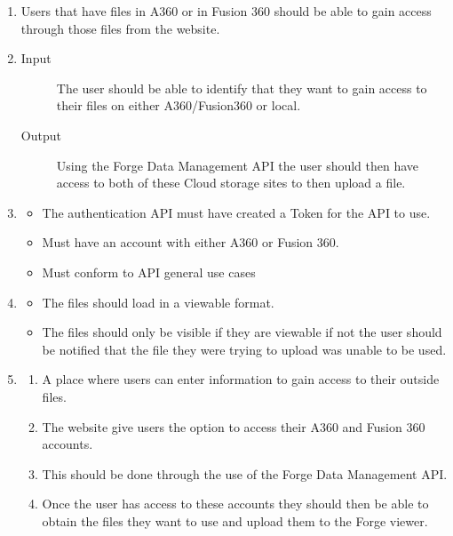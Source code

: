 \documentclass[letterpaper, 10pt, draftclsnofoot, compsoc, onecolumn]{IEEEtran}
\begin{document}
\begin{enumerate}
	\item Users that have files in A360 or in Fusion 360 should be able to gain access through those files from the
	website.

	\item
	\begin{description} 
		\item[Input] The user should be able to identify that they want to gain access to their files on either A360/Fusion360 or local. 
		\item[Output] Using the Forge Data Management API the user should then have access to both of these Cloud storage sites to then upload a file.
	\end{description}

	\item
	\begin{itemize}
		\item The authentication API must have created a Token for the API to use.
		\item Must have an account with either A360 or Fusion 360. 
		\item Must conform to API general use cases
	\end{itemize}

	\item
	\begin{itemize}
		\item The files should load in a viewable format.
		\item The files should only be visible if they are viewable if not the user should be notified that the file
			they were trying to upload was unable to be used.
	\end{itemize}
	
	\item 
	\begin{enumerate}
		\item A place where users can enter information to gain access to their outside files. %
		\item The website give users the option to access their A360 and Fusion 360 accounts. 
		\item This should be done through the use of the Forge Data Management API. 
		\item Once the user has access to these accounts they should then be able to obtain the 
		files they want to use and upload them to the Forge viewer.
	\end{enumerate}
\end{enumerate}
\end{document}
